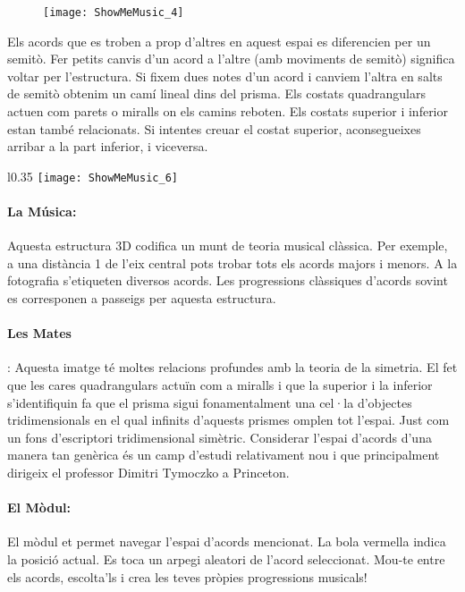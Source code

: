 \begin{figure}[h]
\centering
\texttt{[image: ShowMeMusic\_4]}
\end{figure}

Els acords que es troben a prop d'altres en aquest espai es diferencien per un semitò. Fer petits canvis d'un acord a l'altre (amb moviments de semitò) significa voltar per l'estructura. Si fixem dues notes d'un acord i canviem l'altra en salts de semitò obtenim un camí lineal dins del prisma. Els costats quadrangulars actuen com parets o miralls on els camins reboten. Els costats superior i inferior estan també relacionats. Si intentes creuar el costat superior, aconsegueixes arribar a la part inferior, i viceversa.
 
\begin{wrapfigure}{l}{0.35\textwidth}
\centering
\texttt{[image: ShowMeMusic\_6]}
\end{wrapfigure}
\paragraph{La Música:}  Aquesta estructura 3D codifica un munt de teoria musical clàssica. Per exemple, a una distància 1 de l'eix central pots trobar tots els acords majors i menors. A la fotografia s'etiqueten diversos acords. Les progressions clàssiques d'acords sovint es corresponen a passeigs per aquesta estructura. 

\paragraph{Les Mates}: Aquesta imatge té moltes relacions profundes amb la teoria de la simetria. El fet que les cares quadrangulars actuïn com a miralls i que la superior i la inferior s'identifiquin fa que el prisma sigui fonamentalment una cel·la d'objectes tridimensionals en el qual infinits d'aquests prismes omplen tot l'espai. Just com un fons d'escriptori tridimensional simètric.  Considerar l'espai d'acords d'una manera tan genèrica és un  camp d'estudi relativament nou i que principalment dirigeix el professor Dimitri Tymoczko a Princeton.\\


\paragraph{El Mòdul:} El mòdul et permet navegar l'espai d'acords mencionat. La bola vermella indica la posició actual. Es toca un arpegi aleatori de l'acord seleccionat. Mou-te entre els acords, escolta'ls i crea les teves pròpies progressions musicals! 

